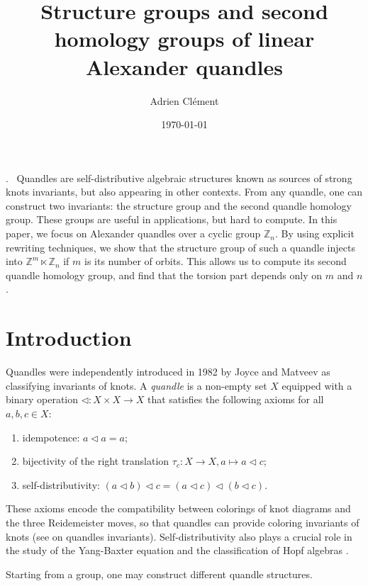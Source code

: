\documentclass[a4paper,11pt]{amsart}
\title[Structure groups and second homology groups of Alexander quandles]{Structure groups and second homology groups of linear Alexander quandles}
\author[Adrien Clément]{Adrien Clément}
\date{\today}
\theoremstyle{definition}
\newcommand{\Z}{{\mathbb Z}}
\newcommand{\znz}[1]{\Z_{#1}}
\renewenvironment{abstract}
 {\par\noindent\textsc{\abstractname.}\ \ignorespaces}
 {\par\medskip}
\begin{document}
\maketitle

\begin{abstract}
Quandles are self-distributive algebraic structures known as sources of strong knots invariants, but also appearing in other contexts.
From any quandle, one can construct two invariants: the structure group and the second quandle homology group.
These groups are useful in applications, but hard to compute.
In this paper, we focus on Alexander quandles over a cyclic group $\znz{n}$.
By using explicit rewriting techniques, we show that the structure group of such a quandle injects into $\Z^m \ltimes \znz{n}$ if $m$ is its number of orbits.
This allows us to compute its second quandle homology group, and find that the torsion part depends only on $m$ and $n$.
\end{abstract}

\section{Introduction}
Quandles were independently introduced in 1982 by Joyce  \cite{joyceClassifyingInvariantKnots1982} and Matveev \cite{matveevDistributiveGroupoidsKnot1982} as classifying invariants of knots.
A \emph{quandle} is a non-empty set $X$ equipped with a binary operation $\lhd: X\times X \to X$ that satisfies the following axioms for all $a,b,c\in X$:
\begin{enumerate}
\item idempotence: $a\lhd a = a$;
\item bijectivity of the right translation $\tau_c\colon X\to X, a\mapsto a\lhd c$;
\item self-distributivity: $(a\lhd b)\lhd c = (a\lhd c)\lhd (b\lhd c)$.
\end{enumerate}
These axioms encode the compatibility between colorings of knot diagrams and the three Reidemeister moves, so that quandles can provide coloring invariants of knots (see \cite{elhamdadiQuandlesIntroductionAlgebra2015,kamadaKnotInvariantsDerived2002} on quandles invariants).
Self-distributivity also plays a crucial role in the study of the Yang-Baxter equation \cite{brieskornAutomorphicSetsBraids1988} and the classification of Hopf algebras \cite{andruskiewitschRacksPointedHopf2003}.

Starting from a group, one may construct different quandle structures.
\end{document}
